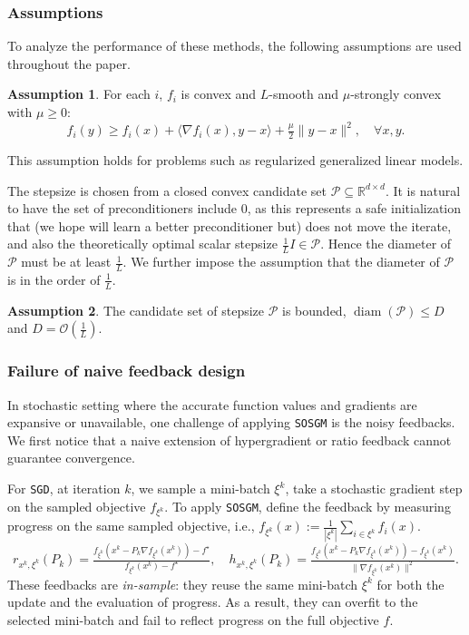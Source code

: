 \documentclass{article}
\theoremstyle{definition}
\newtheorem{assumption}{Assumption}[section]
\newcommand{\sosgm}{\texttt{SOSGM}}
\newcommand{\assign}{:=}
\newcommand{\sgd}{\texttt{SGD}}
\begin{document}
\subsubsection{Assumptions}

To analyze the performance of these methods, the following assumptions are used throughout the paper.
\begin{assumption}\label{as:smooth}
  For each $i$, $f_i$ is convex and $L$-smooth and $\mu$-strongly convex with $\mu \geq 0$:
  \[
  f_i(y)\geq f_i(x)+\langle \nabla f_i(x), y-x\rangle + \tfrac{\mu}{2}\|y-x\|^2,\quad \forall x,y.
  \]
\end{assumption}
This assumption holds for problems such as regularized generalized linear models.

The stepsize is chosen from a closed convex candidate set $\mathcal{P} \subseteq \mathbb{R}^{d \times d}$. 
It is natural to have the set of preconditioners include $0$, 
as this represents a safe initialization that (we hope will learn a better preconditioner but) does not move the iterate,
and also the theoretically optimal scalar stepsize $\tfrac{1}{L} I \in \mathcal{P}$.
Hence the diameter of $\mathcal{P}$ must be at least $\tfrac{1}{L}$. 
We further impose the assumption that the diameter of $\mathcal{P}$ is in the order of $\tfrac{1}{L}$.
\begin{assumption}\label{as:diam}
  The candidate set of stepsize $\mathcal{P}$ is bounded, $\operatorname{diam}(\mathcal{P}) \leq D$ and $D=\mathcal{O}(\tfrac{1}{L})$.
\end{assumption}

\subsubsection{Failure of naive feedback design}

In stochastic setting where the accurate function values and gradients are expansive or unavailable, one challenge of applying {\sosgm} is the noisy feedbacks. 
We first notice that a naive extension of hypergradient or ratio feedback cannot guarantee convergence.

For {\sgd}, at iteration $k$, we sample a mini-batch $\xi^k$, take a stochastic gradient step on the sampled objective $f_{\xi^k}$. 
To apply {\sosgm}, define the feedback by measuring progress on the same sampled objective, i.e., $f_{\xi^k}(x) \assign \tfrac{1}{|\xi^k|}\sum_{i\in \xi^k} f_i(x)$.
\begin{equation}
  r_{x^k, \xi^k} (P_k) = \tfrac{f_{\xi^k} (x^k - P_k \nabla f_{\xi^k} (x^k)) -
  f^{\star}}{f_{\xi^k} (x^k) - f^{\star}}, \quad
  h_{x^k, \xi^k} (P_k) = \tfrac{f_{\xi^k} (x^k - P_k \nabla f_{\xi^k} (x^k)) -
  f_{\xi^k} (x^k)}{\| \nabla f_{\xi^k} (x^k) \|^2}. \label{eq:hoverfit}
\end{equation}
These feedbacks are \emph{in-sample}: they reuse the same mini-batch $\xi^k$ for both the update and the evaluation of progress.
As a result, they can overfit to the selected mini-batch and fail to reflect progress on the full objective $f$.
\end{document}
